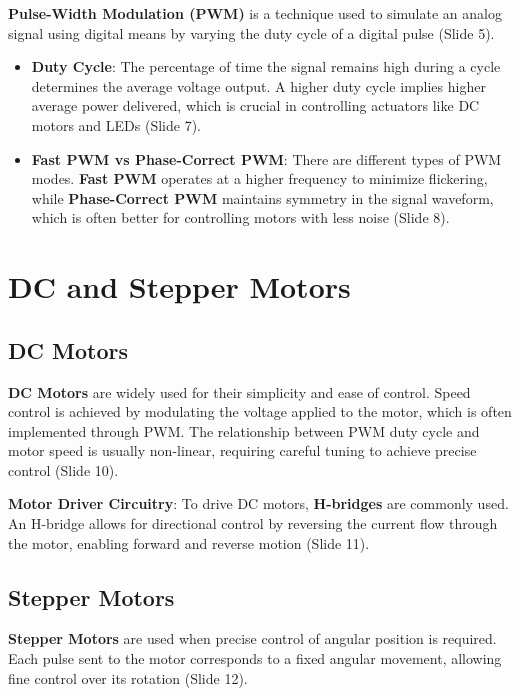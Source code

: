 \documentclass[
  14pt,
  a4paper,
  numbers=noendperiod,
  headinclude=true,
  footinclude=true,
  DIV=calc]{scrreprt}
\begin{document}
\textbf{Pulse-Width Modulation (PWM)} is a technique used to simulate an
analog signal using digital means by varying the duty cycle of a digital
pulse (Slide 5).

\begin{itemize}
\item
  \textbf{Duty Cycle}: The percentage of time the signal remains high
  during a cycle determines the average voltage output. A higher duty
  cycle implies higher average power delivered, which is crucial in
  controlling actuators like DC motors and LEDs (Slide 7).
\item
  \textbf{Fast PWM vs Phase-Correct PWM}: There are different types of
  PWM modes. \textbf{Fast PWM} operates at a higher frequency to
  minimize flickering, while \textbf{Phase-Correct PWM} maintains
  symmetry in the signal waveform, which is often better for controlling
  motors with less noise (Slide 8).
\end{itemize}

\section{DC and Stepper Motors}\label{dc-and-stepper-motors}

\subsection{DC Motors}\label{dc-motors}

\textbf{DC Motors} are widely used for their simplicity and ease of
control. Speed control is achieved by modulating the voltage applied to
the motor, which is often implemented through PWM. The relationship
between PWM duty cycle and motor speed is usually non-linear, requiring
careful tuning to achieve precise control (Slide 10).

\textbf{Motor Driver Circuitry}: To drive DC motors, \textbf{H-bridges}
are commonly used. An H-bridge allows for directional control by
reversing the current flow through the motor, enabling forward and
reverse motion (Slide 11).

\subsection{Stepper Motors}\label{stepper-motors}

\textbf{Stepper Motors} are used when precise control of angular
position is required. Each pulse sent to the motor corresponds to a
fixed angular movement, allowing fine control over its rotation (Slide
12).
\end{document}
